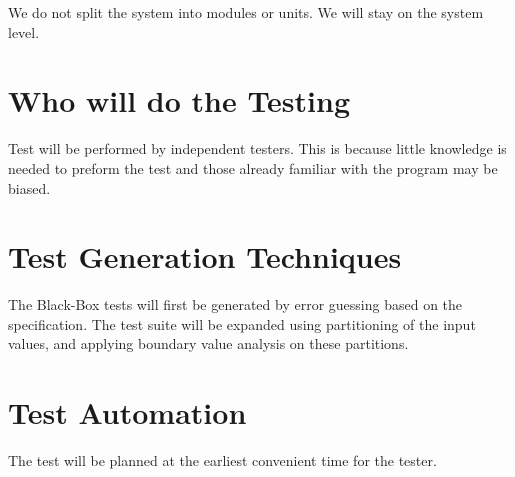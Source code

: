\documentclass[11pt,a4paper]{article}
\begin{document}
We do not split the system into modules or units. We will stay on the system level.


\section{Who will do the Testing}

Test will be performed by independent testers. This is because little
knowledge is needed to preform the test and those already familiar
with the program may be biased.     \label{sec:test-generation}





\section{Test Generation Techniques}
The Black-Box tests will first be generated by error guessing based on the specification. The test suite will be expanded using partitioning of the input values, and applying boundary value analysis on these partitions.


\section{Test Automation}\label{sec:test-automation}

The test will be planned at the earliest convenient time for the
tester.
\end{document}

